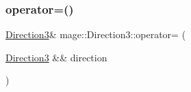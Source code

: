 \hypertarget{structmage_1_1_direction3_aaf4d2b9927d99ab3b703c1e6e61a5f36}{}\label{structmage_1_1_direction3_aaf4d2b9927d99ab3b703c1e6e61a5f36} 
\subsubsection{\texorpdfstring{operator=()}{operator=()}\hspace{0.1cm}{\footnotesize\ttfamily [2/2]}}
{\footnotesize\ttfamily \hyperlink{structmage_1_1_direction3}{Direction3}\& mage\+::\+Direction3\+::operator= (\begin{DoxyParamCaption}\item[{\hyperlink{structmage_1_1_direction3}{Direction3} \&\&}]{direction }\end{DoxyParamCaption})}


